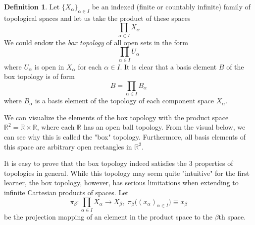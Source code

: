 \documentclass{article}
\theoremstyle{remark}
\theoremstyle{definition}
\newtheorem{definition}{Definition}[section]
\begin{document}
\begin{definition}
Let $\{X_\alpha\}_{\alpha \in I}$ be an indexed (finite or countably infinite) family of topological spaces and let us take the product of these spaces
\[\prod_{\alpha \in I} X_\alpha\]
We could endow the \textit{box topology} of all open sets in the form
\[\prod_{\alpha \in I} U_\alpha\]
where $U_\alpha$ is open in $X_\alpha$ for each $\alpha \in I$. It is clear that a basis element $B$ of the box topology is of form
\[B = \prod_{\alpha \in I} B_\alpha\]
where $B_\alpha$ is a basis element of the topology of each component space $X_\alpha$. 
\end{definition}

We can visualize the elements of the box topology with the product space $\mathbb{R}^2 = \mathbb{R} \times \mathbb{R}$, where each $\mathbb{R}$ has an open ball topology. From the visual below, we can see why this is called the "box" topology. Furthermore, all basis elements of this space are arbitrary open rectangles in $\mathbb{R}^2$. 
\begin{center}
\end{center}

It is easy to prove that the box topology indeed satisfies the 3 properties of topologies in general. While this topology may seem quite "intuitive" for the first learner, the box topology, however, has serious limitations when extending to infinite Cartesian products of spaces. Let 
\[\pi_\beta: \prod_{\alpha \in I} X_\alpha \longrightarrow X_\beta, \; \pi_\beta \big( (x_\alpha)_{\alpha \in I}\big) \equiv x_\beta\] 
be the projection mapping of an element in the product space to the $\beta$th space. 
\end{document}
